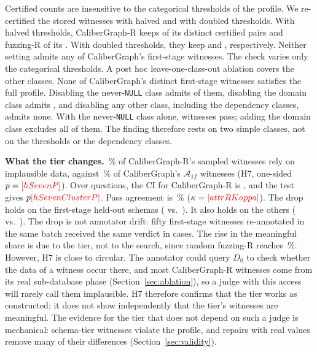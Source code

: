 Certified counts are insensitive to the categorical thresholds of the profile. We re-certified the stored witnesses with halved and with doubled thresholds. With halved thresholds, CaliberGraph-R keeps  of its  distinct certified pairs and fuzzing-R  of its . With doubled thresholds, they keep  and , respectively. Neither setting admits any of CaliberGraph's first-stage witnesses. The check varies only the categorical thresholds. A post hoc leave-one-class-out ablation covers the other classes. None of CaliberGraph's  distinct first-stage witnesses satisfies the full profile. Disabling the never-\texttt{NULL} class admits  of them, disabling the domain class admits , and disabling any other class, including the dependency classes, admits none. With the never-\texttt{NULL} class alone,  witnesses pass; adding the domain class excludes all of them. The finding therefore rests on two simple classes, not on the thresholds or the dependency classes.

\textbf{What the tier changes.} \,\% of CaliberGraph-R's sampled witnesses rely on implausible data, against \,\% of CaliberGraph's $\mathcal A_{1f}$ witnesses (H7, one-sided $p=\V{hSevenP}$). Over questions, the CI for CaliberGraph-R is , and the test gives $p\V{hSevenClusterP}$. Pass agreement is \,\% ($\kappa=\V{attrRKappa}$). The drop holds on the first-stage held-out schemas ( vs.\ ). It also holds on the others ( vs.\ ). The drop is not annotator drift: fifty first-stage witnesses re-annotated in the same batch received the same verdict in  cases. The rise in the meaningful share is due to the tier, not to the search, since random fuzzing-R reaches \,\%. However, H7 is close to circular. The annotator could query $D_0$ to check whether the data of a witness occur there, and most CaliberGraph-R witnesses come from its real sub-database phase (Section~\ref{sec:ablation}), so a judge with this access will rarely call them implausible. H7 therefore confirms that the tier works as constructed; it does not show independently that the tier's witnesses are meaningful. The evidence for the tier that does not depend on such a judge is mechanical: schema-tier witnesses violate the profile, and repairs with real values remove many of their differences (Section~\ref{sec:validity}).

